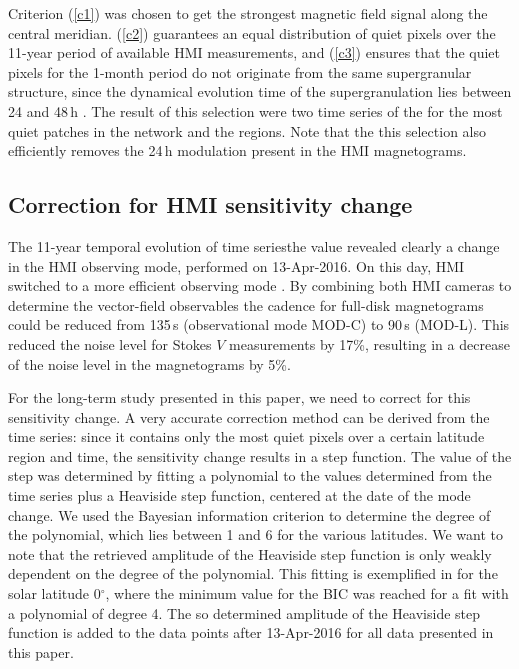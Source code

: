 \documentclass{aa}
\begin{document}
Criterion (\ref{c1}) was chosen to get the strongest magnetic field signal along the central meridian. (\ref{c2}) guarantees an equal distribution of quiet pixels over the 11-year period of available HMI measurements, and (\ref{c3}) ensures that the quiet pixels for the 1-month period do not originate from the same supergranular structure, since the dynamical evolution time of the supergranulation lies between 24 and 48\,h \cite[]{2010LRSP....7....2R}. The result of this selection were two time series of the \brms{} for the most quiet patches in the network and the \IN{} regions. Note that the this selection also efficiently removes the 24\,h modulation present in the HMI magnetograms.

\subsection{Correction for HMI sensitivity change\label{sensicorr}}

The 11-year temporal evolution of \inw{} time series{the \brms{}} value revealed clearly a change in the HMI observing mode, performed on 13-Apr-2016. On this day, HMI switched to a more efficient observing mode \cite[see][]{2018SoPh..293...45H,2014SoPh..289.3483H,2016SoPh..291.1887C}. By combining both HMI cameras to determine the vector-field observables the cadence for full-disk magnetograms could be reduced from 135\,s (observational mode MOD-C) to 90\,s (MOD-L). This reduced the noise level for Stokes $V$ measurements by 17\%, resulting in a decrease of the noise level in the \los{} magnetograms by 5\%.

For the long-term study presented in this paper, we need to correct for this sensitivity change. A very accurate correction method can be derived from the \inw{} time series: since it contains only the most quiet pixels over a certain latitude region and time, the sensitivity change results in a step function. The value of the step was determined by fitting a polynomial to the \brms{} values determined from the \inw{} time series plus a Heaviside step function, centered at the date of the mode change. We used the Bayesian information criterion \cite[BIC,][]{Stoica2004} to determine the degree of the polynomial, which lies between 1 and 6 for the various latitudes. We want to note that the retrieved amplitude of the Heaviside step function is only weakly dependent on the degree of the polynomial. This fitting is exemplified in  for the solar latitude 0$^\circ$, where the minimum value for the BIC was reached for a fit with a polynomial of degree 4. The so determined amplitude of the Heaviside step function is added to the data points after 13-Apr-2016 for all data presented in this paper.
\end{document}
